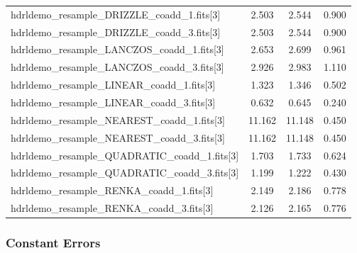 \begin{table}
\begin{center}
\begin{tabular}{|l|c|c|c|}
         hdrldemo\_resample\_DRIZZLE\_coadd\_1.fits[3]        &2.503		   &2.544               &0.900         \\
         hdrldemo\_resample\_DRIZZLE\_coadd\_3.fits[3]        &2.503               &2.544               &0.900         \\
         hdrldemo\_resample\_LANCZOS\_coadd\_1.fits[3]        &2.653               &2.699               &0.961         \\
         hdrldemo\_resample\_LANCZOS\_coadd\_3.fits[3]        &2.926               &2.983               &1.110         \\
         hdrldemo\_resample\_LINEAR\_coadd\_1.fits[3]         &1.323               &1.346               &0.502         \\
         hdrldemo\_resample\_LINEAR\_coadd\_3.fits[3]         &0.632               &0.645               &0.240         \\
         hdrldemo\_resample\_NEAREST\_coadd\_1.fits[3]        &11.162 	   &11.148 		&0.450         \\
         hdrldemo\_resample\_NEAREST\_coadd\_3.fits[3]        &11.162          &11.148 			&0.450         \\
         hdrldemo\_resample\_QUADRATIC\_coadd\_1.fits[3]      &1.703               &1.733               &0.624         \\
         hdrldemo\_resample\_QUADRATIC\_coadd\_3.fits[3]      &1.199               &1.222               &0.430         \\
         hdrldemo\_resample\_RENKA\_coadd\_1.fits[3]          &2.149               &2.186               &0.778         \\
         hdrldemo\_resample\_RENKA\_coadd\_3.fits[3]          &2.126               &2.165               &0.776         \\
\bottomrule

\end{tabular}	
\end{center}																											

\label{tab:errors}
\end{table}



\subsubsection{Constant Errors}

